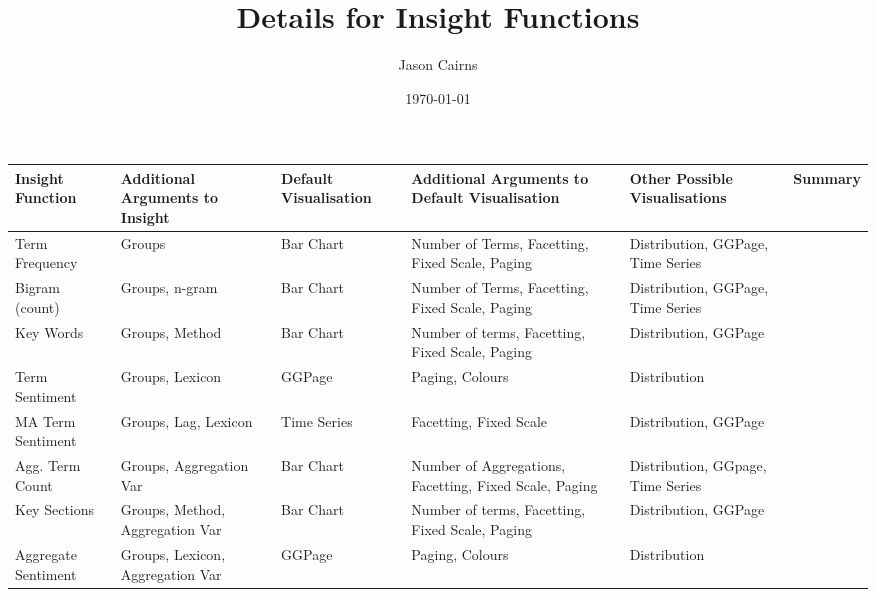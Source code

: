 \documentclass[a4paper, 11pt]{article}
\author{Jason Cairns}
\date{\today}
\title{Details for Insight Functions}
\begin{document}
\begin{landscape}
\begin{tabular}{p{3cm}p{3cm}p{3cm}p{3cm}p{3cm}p{3cm}}
Insight Function & Additional Arguments to Insight & Default Visualisation & Additional Arguments to Default Visualisation & Other Possible Visualisations & Summary\\
\hline
Term Frequency & Groups & Bar Chart & Number of Terms, Facetting, Fixed Scale, Paging & Distribution, GGPage, Time Series\\
Bigram (count) & Groups, n-gram & Bar Chart & Number of Terms, Facetting, Fixed Scale, Paging & Distribution, GGPage, Time Series\\
Key Words & Groups, Method & Bar Chart & Number of terms, Facetting, Fixed Scale, Paging & Distribution, GGPage\\
Term Sentiment & Groups, Lexicon & GGPage & Paging, Colours & Distribution\\
MA Term Sentiment & Groups, Lag, Lexicon & Time Series & Facetting, Fixed Scale & Distribution, GGPage\\
Agg. Term Count & Groups, Aggregation Var & Bar Chart & Number of Aggregations, Facetting, Fixed Scale, Paging & Distribution, GGpage, Time Series\\
Key Sections & Groups, Method, Aggregation Var & Bar Chart & Number of terms, Facetting, Fixed Scale, Paging & Distribution, GGPage\\
Aggregate Sentiment & Groups, Lexicon, Aggregation Var & GGPage & Paging, Colours & Distribution\\
\end{tabular}
\end{landscape}
\end{document}
